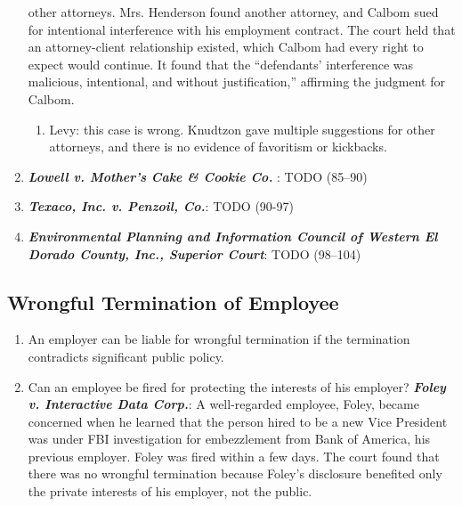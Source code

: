 \begin{enumerate}
    other attorneys. Mrs. Henderson found another attorney, and Calbom sued 
    for intentional interference with his employment contract. The court held 
    that an attorney-client relationship existed, which Calbom had every right 
    to expect would continue. It found that the ``defendants' interference was 
    malicious, intentional, and without justification,'' affirming the 
    judgment for Calbom.
    \begin{enumerate}
        \item Levy: this case is wrong. Knudtzon gave multiple suggestions for 
        other attorneys, and there is no evidence of favoritism or kickbacks.
    \end{enumerate}

    \item \textbf{\emph{Lowell v. Mother's Cake \& Cookie Co. }}: TODO 
    (85--90) %
    \item \textbf{\emph{Texaco, Inc. v. Penzoil, Co.}}: TODO (90-97)
    \item \textbf{\emph{Environmental Planning and Information Council of 
    Western El Dorado County, Inc., Superior Court}}: TODO (98--104)
\end{enumerate}

\subsection{Wrongful Termination of Employee}

\begin{enumerate}
    \item An employer can be liable for wrongful termination if the 
    termination contradicts significant public policy.
    \item Can an employee be fired for protecting the interests of his 
    employer? \textbf{\emph{Foley v. Interactive Data Corp.}}: A well-regarded 
    employee, Foley, became concerned when he learned that the person hired to 
    be a new Vice President was under FBI investigation for embezzlement from 
    Bank of America, his previous employer. Foley was fired within a few days. 
    The court found that there was no wrongful termination because Foley's 
    disclosure benefited only the private interests of his employer, not the 
    public.
    

\end{enumerate}

